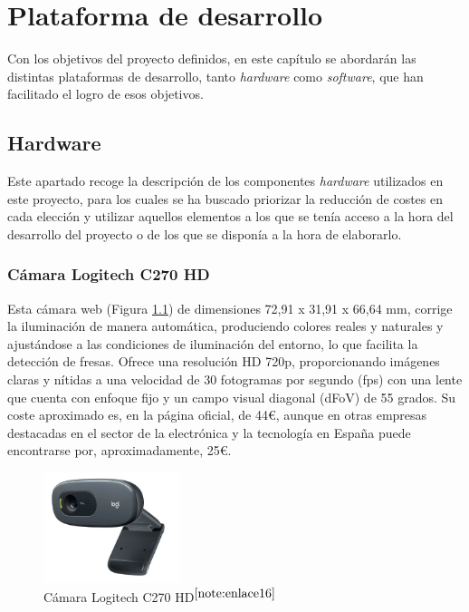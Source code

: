 \chapter{Plataforma de desarrollo}
\label{cap:capitulo4}
 
Con los objetivos del proyecto definidos, en este capítulo se abordarán las distintas plataformas de desarrollo, tanto \textit{hardware} como \textit{software}, que han facilitado el logro de esos objetivos.

\section{Hardware}
\label{sec:hardware}

Este apartado recoge la descripción de los componentes \textit{hardware} utilizados en este proyecto, para los cuales se ha buscado priorizar la reducción de costes en cada elección y utilizar aquellos elementos a los que se tenía acceso a la hora del desarrollo del proyecto o de los que se disponía a la hora de elaborarlo.

\subsection{Cámara Logitech C270 HD}
\label{subsec:logiC270HD}

Esta cámara web (Figura \ref{fig:logiC270HD}) de dimensiones 72,91 x 31,91 x 66,64 mm, corrige la iluminación de manera automática, produciendo colores reales y naturales y ajustándose a las condiciones de iluminación del entorno, lo que facilita la detección de fresas. Ofrece una resolución HD 720p, proporcionando imágenes claras y nítidas a una velocidad de 30 fotogramas por segundo (fps) con una lente que cuenta con enfoque fijo y un campo visual diagonal (dFoV) de 55 grados. Su coste aproximado es, en la página oficial, de 44€, aunque en otras empresas destacadas en el sector de la electrónica y la tecnología en España puede encontrarse por, aproximadamente, 25€.

\begin{figure} [H]
    \begin{center}
      \includegraphics[width=4cm]{figs/logi C270.png}
    \end{center}
    \caption{Cámara Logitech C270 HD$^{\ref{note:enlace16}}$}
    \label{fig:logiC270HD}
\end{figure}

